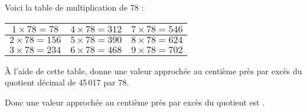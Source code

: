 Voici la table de multiplication de 78 :
\begin{center}
\begin{tabular}{|c|c|c|}
\hline
$1\times78=78$&$4\times78=312$&$7\times78=546$\\
\hline
$2\times78=156$&$5\times78=390$&$8\times78=624$\\
\hline
$3\times78=234$&$6\times78=468$&$9\times78=702$\\
\hline
\end{tabular}
\end{center}
\`A l'aide de cette table, donne une valeur approchée au centième près
par excès du quotient décimal de 45\,017 par 78.
\par Donc une valeur approchée au centième près par excès du quotient est .
